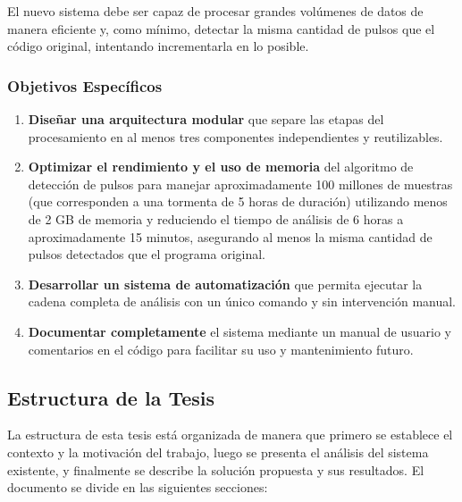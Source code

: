 \documentclass[12pt,a4paper]{article}
\begin{document}
El nuevo sistema debe ser capaz de procesar grandes volúmenes de datos de manera eficiente y, como mínimo, detectar la misma cantidad de pulsos que el código original, intentando incrementarla en lo posible.

\subsubsection{Objetivos Específicos}

\begin{enumerate}
    \item \textbf{Diseñar una arquitectura modular} que separe las etapas del procesamiento en al menos tres componentes independientes y reutilizables.

    \item \textbf{Optimizar el rendimiento y el uso de memoria} del algoritmo de detección de pulsos para manejar aproximadamente 100 millones de muestras (que corresponden a una tormenta de 5 horas de duración) utilizando menos de 2 GB de memoria y reduciendo el tiempo de análisis de 6 horas a aproximadamente 15 minutos, asegurando al menos la misma cantidad de pulsos detectados que el programa original.

    \item \textbf{Desarrollar un sistema de automatización} que permita ejecutar la cadena completa de análisis con un único comando y sin intervención manual.

    \item \textbf{Documentar completamente} el sistema mediante un manual de usuario y comentarios en el código para facilitar su uso y mantenimiento futuro.
\end{enumerate}

\subsection{Estructura de la Tesis}
\lhead{}

La estructura de esta tesis está organizada de manera que primero se establece el contexto y la motivación del trabajo, luego se presenta el análisis del sistema existente, y finalmente se describe la solución propuesta y sus resultados. El documento se divide en las siguientes secciones:
\end{document}
